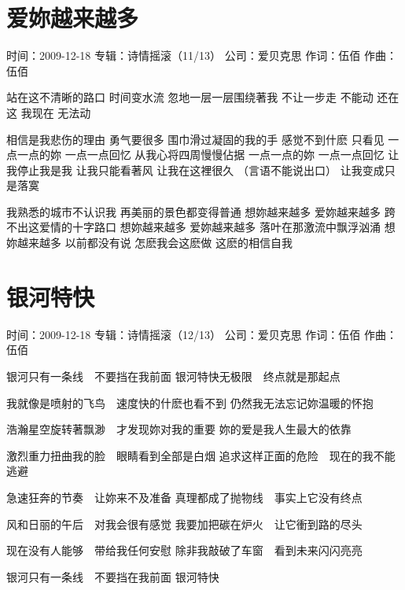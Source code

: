 \documentclass[UTF8,a4paper,oneside,twocolumn,12pt]{ctexbook}
\newcommand{\infopair}[2]{\textbullet #1：#2}
\newcommand{\zc}[1][伍佰]{\infopair{作词}{#1}}
\newcommand{\zq}[1][伍佰]{\infopair{作曲}{#1}}
\newcommand{\zj}[1]{\infopair{专辑}{#1}}
\newcommand{\sj}[1]{\infopair{时间}{#1}}
\newcommand{\gs}[1]{\infopair{公司}{#1}}
\newenvironment{info}{\begin{flushleft}\kaishu
	}
	{\end{flushleft}\normalsize\yahei\par}
\newenvironment{lyric}{
	}
{}
\begin{document}
\section{爱妳越来越多}
\begin{info}
	\sj{2009-12-18}
	\zj{诗情摇滚（11/13）}
	\gs{爱贝克思}
	\zc
	\zq
\end{info}
\begin{lyric}
	站在这不清晰的路口 时间变水流
	忽地一层一层围绕著我 不让一步走
	不能动 还在这 我现在 无法动

	相信是我悲伤的理由 勇气要很多
	围巾滑过凝固的我的手 感觉不到什麽
	只看见 一点一点的妳 一点一点回忆
	从我心将四周慢慢佔据
	一点一点的妳 一点一点回忆
	让我停止我是我 让我只能看著风
	让我在这裡很久 （言语不能说出口） 让我变成只是落寞

	我熟悉的城市不认识我
	再美丽的景色都变得普通
	想妳越来越多 爱妳越来越多
	跨不出这爱情的十字路口
	想妳越来越多 爱妳越来越多
	落叶在那激流中飘浮汹涌
	想妳越来越多 以前都没有说
	怎麽我会这麽做 这麽的相信自我
\end{lyric}

\section{银河特快}
\begin{info}
	\sj{2009-12-18}
	\zj{诗情摇滚（12/13）}
	\gs{爱贝克思}
	\zc
	\zq
\end{info}
\begin{lyric}
	银河只有一条线　不要挡在我前面
	银河特快无极限　终点就是那起点

	我就像是喷射的飞鸟　速度快的什麽也看不到
	仍然我无法忘记妳温暖的怀抱

	浩瀚星空旋转著飘渺　才发现妳对我的重要
	妳的爱是我人生最大的依靠

	激烈重力扭曲我的脸　眼睛看到全部是白烟
	追求这样正面的危险　现在的我不能逃避

	急速狂奔的节奏　让妳来不及准备
	真理都成了抛物线　事实上它没有终点

	风和日丽的午后　对我会很有感觉
	我要加把碳在炉火　让它衝到路的尽头

	现在没有人能够　带给我任何安慰
	除非我敲破了车窗　看到未来闪闪亮亮

	银河只有一条线　不要挡在我前面 银河特快
\end{lyric}
\end{document}
